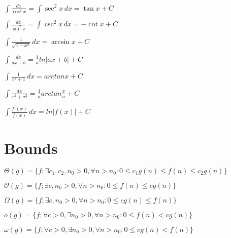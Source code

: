 \documentclass[a4paper]{article}
\begin{document}
\begin{multicols*}{2}
{\begin{center}
\begin{small}
\begin{compactenum}
				\item \begin{math}
					\int \frac{dx}{\cos^2 x}=\int \sec^2 x \, dx = \tan x + C
				\end{math}
				\item \begin{math}
					\int \frac{dx}{\sin^2 x}=\int \csc^2 x \, dx = -\cot x + C
				\end{math}
				\item \begin{math}
					\int {\frac{1}{\sqrt{1-x^2}}} \, dx = \arcsin {x} + C
				\end{math}
				\item \begin{math}
					\int \frac{dx}{ax + b} = \frac{1}{a} ln |ax + b| + C
				\end{math}
				\item \begin{math}
					\int \frac{1}{x^2 + 1} \, dx = arctan x + C
				\end{math}
				\item \begin{math}
					\int \frac{dx}{x^2 + a^2} = \frac{1}{a} arctan \frac{x}{a} + C
				\end{math}
				\item \begin{math}
					\int \frac{f'(x)}{f(x)} \, dx = ln|f(x)| + C
				\end{math}
			\end{compactenum}
		\end{small}
	\end{center}

	\section{Bounds}
	\begin{compactitem}
		\item $\Theta(g) = \{f; \exists c_1,c_2,n_0>0, \forall n>n_0: 0 \leq c_1g(n)\leq f(n) \leq c_2g(n)\}$
		\item $\mathcal{O}(g) = \{f; \exists c,n_0>0, \forall n>n_0: 0 \leq f(n) \leq cg(n)\}$
		\item $\Omega(g) = \{f; \exists c,n_0>0, \forall n>n_0: 0 \leq cg(n) \leq f(n)\}$
		\item $o(g) = \{f;\forall c>0,\exists n_0>0,\forall n > n_0: 0 \leq f(n) < cg(n)\}$
		\item $\omega(g) = \{f;\forall c>0,\exists n_0>0,\forall n > n_0: 0 \leq cg(n) < f(n)\}$
	\end{compactitem}


}
\end{multicols*}
\end{document}
